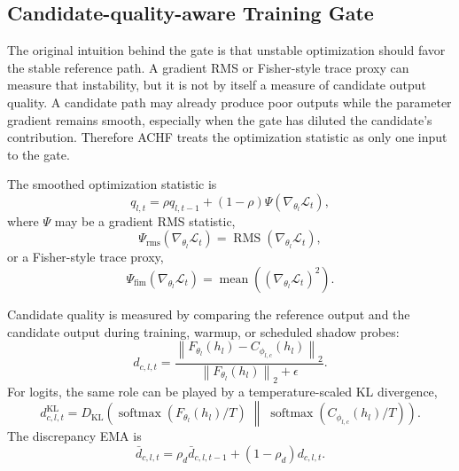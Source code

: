 \documentclass{article}
\newcommand{\achf}{\textsc{ACHF}}
\begin{document}
\subsection{Candidate-quality-aware Training Gate}

The original intuition behind the gate is that unstable optimization should
favor the stable reference path. A gradient RMS or Fisher-style trace proxy can
measure that instability, but it is not by itself a measure of candidate output
quality. A candidate path may already produce poor outputs while the parameter
gradient remains smooth, especially when the gate has diluted the candidate's
contribution. Therefore \achf{} treats the optimization statistic as only one
input to the gate.

The smoothed optimization statistic is
\begin{equation}
q_{l,t}
=\rho q_{l,t-1}
+(1-\rho)\Psi(\nabla_{\theta_l}\mathcal{L}_t),
\label{eq:achf-q-update}
\end{equation}
where $\Psi$ may be a gradient RMS statistic,
\begin{equation}
\Psi_{\mathrm{rms}}(\nabla_{\theta_l}\mathcal{L}_t)
=\operatorname{RMS}(\nabla_{\theta_l}\mathcal{L}_t),
\label{eq:achf-grad-rms}
\end{equation}
or a Fisher-style trace proxy,
\begin{equation}
\Psi_{\mathrm{fim}}(\nabla_{\theta_l}\mathcal{L}_t)
=\operatorname{mean}\!\left((\nabla_{\theta_l}\mathcal{L}_t)^2\right).
\label{eq:achf-fim}
\end{equation}

Candidate quality is measured by comparing the reference output and the
candidate output during training, warmup, or scheduled shadow probes:
\begin{equation}
  d_{c,l,t}
=
\frac{
\left\|
  F_{\theta_l}(h_l)-C_{\phi_{l,c}}(h_l)
\right\|_2
}{
\left\|F_{\theta_l}(h_l)\right\|_2+\epsilon
}.
\label{eq:achf-candidate-discrepancy}
\end{equation}
For logits, the same role can be played by a temperature-scaled KL divergence,
\begin{equation}
  d^{\mathrm{KL}}_{c,l,t}
=
D_{\mathrm{KL}}
\left(
\operatorname{softmax}(F_{\theta_l}(h_l)/T)
\;\middle\|\;
  \operatorname{softmax}(C_{\phi_{l,c}}(h_l)/T)
\right).
\label{eq:achf-candidate-kl}
\end{equation}
The discrepancy EMA is
\begin{equation}
  \bar{d}_{c,l,t}
=
  \rho_d\bar{d}_{c,l,t-1}
+
  (1-\rho_d)d_{c,l,t}.
\label{eq:achf-discrepancy-ema}
\end{equation}
\end{document}
